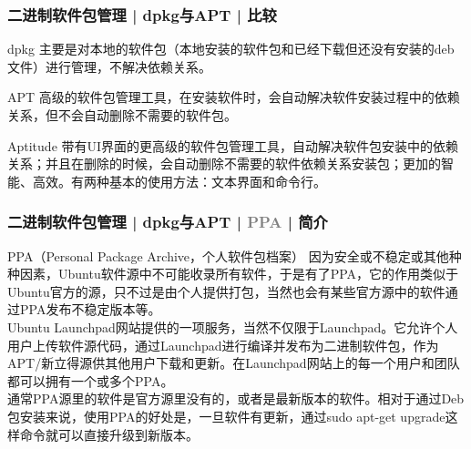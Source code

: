 \begin{frame}
  \frametitle{二进制软件包管理 | dpkg与APT | 比较}
  \begin{block}{dpkg}
    主要是对本地的软件包（本地安装的软件包和已经下载但还没有安装的deb文件）进行管理，不解决依赖关系。
  \end{block}
  \pause
  \begin{block}{APT}
    高级的软件包管理工具，在安装软件时，会自动解决软件安装过程中的依赖关系，但不会自动删除不需要的软件包。
  \end{block}
  \pause
  \begin{block}{Aptitude}
    带有UI界面的更高级的软件包管理工具，自动解决软件包安装中的依赖关系；并且在删除的时候，会自动删除不需要的软件依赖关系安装包；更加的智能、高效。有两种基本的使用方法：文本界面和命令行。
  \end{block}
\end{frame}

\begin{frame}
  \frametitle{二进制软件包管理 | dpkg与APT | \textcolor{gray}{PPA} | 简介}
  \begin{block}{PPA（Personal Package Archive，个人软件包档案）}
     因为安全或不稳定或其他种种因素，Ubuntu软件源中不可能收录所有软件，于是有了PPA，它的作用类似于Ubuntu官方的源，只不过是由个人提供打包，当然也会有某些官方源中的软件通过PPA发布不稳定版本等。\\
     \vspace{5pt}
     Ubuntu Launchpad网站提供的一项服务，当然不仅限于Launchpad。它允许个人用户上传软件源代码，通过Launchpad进行编译并发布为二进制软件包，作为APT/新立得源供其他用户下载和更新。在Launchpad网站上的每一个用户和团队都可以拥有一个或多个PPA。\\
     \vspace{5pt}
     通常PPA源里的软件是官方源里没有的，或者是最新版本的软件。相对于通过Deb包安装来说，使用PPA的好处是，一旦软件有更新，通过sudo apt-get upgrade这样命令就可以直接升级到新版本。
  \end{block}
\end{frame}

